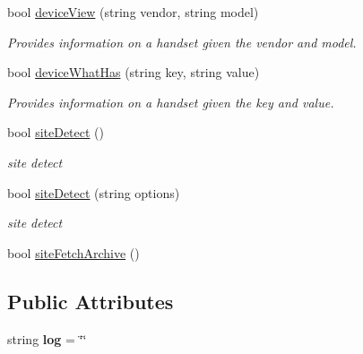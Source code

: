 \begin{DoxyCompactItemize}
bool \hyperlink{class_h_d3_1_1_h_d3_aaba6d717a4579ca6fa7c5727e5d92333}{device\+View} (string vendor, string model)
\begin{DoxyCompactList}\small\item\em Provides information on a handset given the vendor and model. \end{DoxyCompactList}\item 
bool \hyperlink{class_h_d3_1_1_h_d3_a9640edbaf4dd41cd1c8bec9fa86f53a6}{device\+What\+Has} (string key, string value)
\begin{DoxyCompactList}\small\item\em Provides information on a handset given the key and value. \end{DoxyCompactList}\item 
bool \hyperlink{class_h_d3_1_1_h_d3_af32925ae9a40280796ab4ec154ec21b6}{site\+Detect} ()
\begin{DoxyCompactList}\small\item\em site detect \end{DoxyCompactList}\item 
bool \hyperlink{class_h_d3_1_1_h_d3_a1d97b7bb6d69aa9a9b598c12b704f262}{site\+Detect} (string options)
\begin{DoxyCompactList}\small\item\em site detect \end{DoxyCompactList}\item 
bool \hyperlink{class_h_d3_1_1_h_d3_af615c943aace3228c387e3a0a66bac23}{site\+Fetch\+Archive} ()
\end{DoxyCompactItemize}
\subsection*{Public Attributes}
\begin{DoxyCompactItemize}
\item 
\hypertarget{class_h_d3_1_1_h_d3_a1f41f1bf9ad3e7f2f1a9ff837b3f1ba9}{string {\bfseries log} = \char`\"{}\char`\"{}}\label{class_h_d3_1_1_h_d3_a1f41f1bf9ad3e7f2f1a9ff837b3f1ba9}

\end{DoxyCompactItemize}
